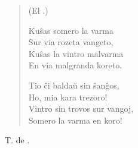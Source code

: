 \begin{verse}
\begin{center}
\footnotesize (El .)
\end{center}
                        Ku\^sas somero la varma\\
                        Sur via rozeta vangeto,\\
                        Ku\^sas la vintro malvarma\\
                        En via malgranda koreto.

                        Tio \^ci balda\u u sin \^san\^gos,\\
                        Ho, mia kara trezoro!\\
                        Vintro sin trovos sur vangoj,\\
                        Somero la varma en koro!

\end{verse}
\begin{flushright}
\footnotesize T. de .
\end{flushright}

\smallrule{}